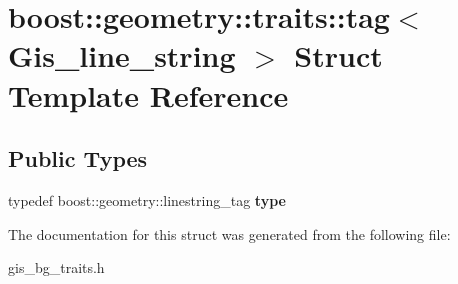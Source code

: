 \hypertarget{structboost_1_1geometry_1_1traits_1_1tag_3_01Gis__line__string_01_4}{}\section{boost\+:\+:geometry\+:\+:traits\+:\+:tag$<$ Gis\+\_\+line\+\_\+string $>$ Struct Template Reference}
\label{structboost_1_1geometry_1_1traits_1_1tag_3_01Gis__line__string_01_4}
\subsection*{Public Types}
\begin{DoxyCompactItemize}
\item 
\mbox{\label{structboost_1_1geometry_1_1traits_1_1tag_3_01Gis__line__string_01_4_aa3c2f4ed1e63e4c27267c448e8c15825}} 
typedef boost\+::geometry\+::linestring\+\_\+tag {\bfseries type}
\end{DoxyCompactItemize}


The documentation for this struct was generated from the following file\+:\begin{DoxyCompactItemize}
\item 
gis\+\_\+bg\+\_\+traits.\+h\end{DoxyCompactItemize}
